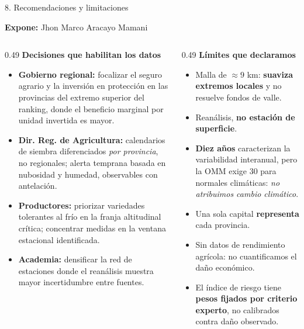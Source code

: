 \documentclass[aspectratio=169,11pt]{beamer}
\newcommand{\ponente}[1]{%
  \begin{flushright}\tiny\textcolor{pnBrandDark}{\textbf{Expone:} #1}\end{flushright}%
  \vspace{-0.9em}%
}
\begin{document}
\begin{frame}{8. Recomendaciones y limitaciones}
  \ponente{Jhon Marco Aracayo Mamani}
  \scriptsize
  \begin{columns}[T]
    \begin{column}{0.49\textwidth}
      \textbf{Decisiones que habilitan los datos}
      \begin{itemize}\itemsep0.18em
        \item \textbf{Gobierno regional:} focalizar el seguro agrario y la inversión en protección en
              las provincias del extremo superior del ranking, donde el beneficio marginal por unidad
              invertida es mayor.
        \item \textbf{Dir. Reg. de Agricultura:} calendarios de siembra diferenciados \emph{por
              provincia}, no regionales; alerta temprana basada en nubosidad y humedad, observables
              con antelación.
        \item \textbf{Productores:} priorizar variedades tolerantes al frío en la franja
              altitudinal crítica; concentrar medidas en la ventana estacional identificada.
        \item \textbf{Academia:} densificar la red de estaciones donde el reanálisis muestra mayor
              incertidumbre entre fuentes.
      \end{itemize}
    \end{column}
    \begin{column}{0.49\textwidth}
      \textbf{Límites que declaramos}
      \begin{itemize}\itemsep0.18em
        \item Malla de $\approx 9$ km: \textbf{suaviza extremos locales} y no resuelve fondos de valle.
        \item Reanálisis, \textbf{no estación de superficie}.
        \item \textbf{Diez años} caracterizan la variabilidad interanual, pero la OMM exige 30 para
              normales climáticas: \emph{no atribuimos cambio climático}.
        \item Una sola capital \textbf{representa} cada provincia.
        \item Sin datos de rendimiento agrícola: no cuantificamos el daño económico.
        \item El índice de riesgo tiene \textbf{pesos fijados por criterio experto}, no calibrados
              contra daño observado.
      \end{itemize}
    \end{column}
  \end{columns}
\end{frame}
\end{document}
